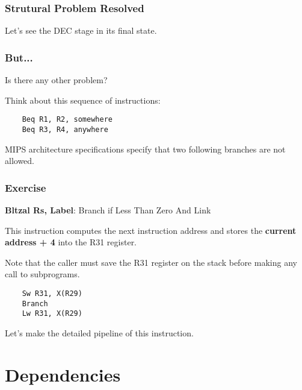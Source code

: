
\begin{frame}
  \frametitle{Strutural Problem Resolved}

  Let's see the DEC stage in its final state.

  \begin{center}
  \end{center}
\end{frame}


\begin{frame}[containsverbatim]
  \frametitle{But...}

  Is there any other problem?

  \-

  Think about this sequence of instructions:

  \begin{verbatim}
    Beq R1, R2, somewhere
    Beq R3, R4, anywhere
  \end{verbatim}

  \-

  MIPS architecture specifications specify that two following branches are
  not allowed.
\end{frame}


\begin{frame}[containsverbatim]
  \frametitle{Exercise}

  \textbf{Bltzal Rs, Label}: Branch if Less Than Zero And Link

  \-

  This instruction computes the next instruction address and stores
  the \textbf{current address + 4} into the R31 register.

  \-

  Note that the caller must save the R31 register on the stack before
  making any call to subprograms.

  \begin{verbatim}
    Sw R31, X(R29)
    Branch
    Lw R31, X(R29)
  \end{verbatim}

  \-

  Let's make the detailed pipeline of this instruction.
\end{frame}

%
%

\section{Dependencies}

